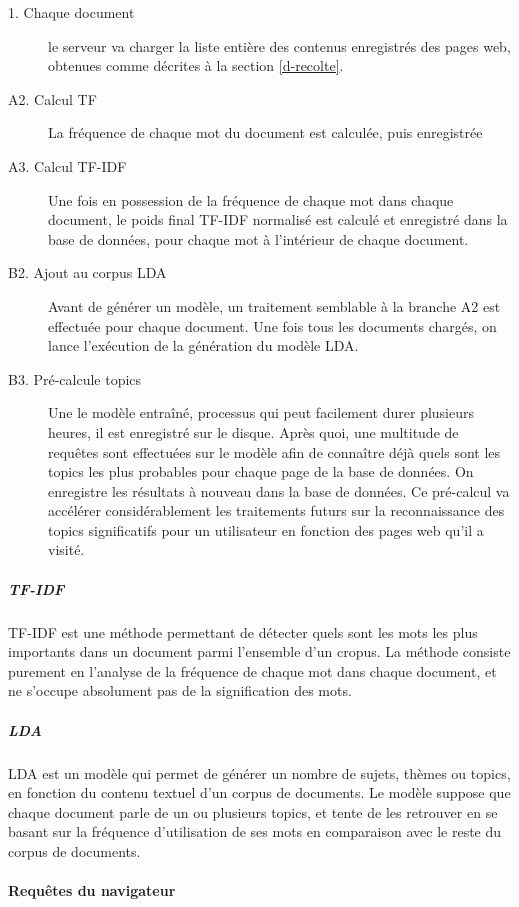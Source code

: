 				\begin{description}
					\item[1. Chaque document] le serveur va charger la liste entière des contenus enregistrés des pages web, obtenues comme décrites à la section \ref{d-recolte}.
					\item[A2. Calcul TF] La fréquence de chaque mot du document est calculée, puis enregistrée
					\item[A3. Calcul TF-IDF] Une fois en possession de la fréquence de chaque mot dans chaque document, le poids final TF-IDF normalisé est calculé et enregistré dans la base de données, pour chaque mot à l'intérieur de chaque document.
					\item[B2. Ajout au corpus LDA] Avant de générer un modèle, un traitement semblable à la branche A2 est effectuée pour chaque document. Une fois tous les documents chargés, on lance l'exécution de la génération du modèle LDA.
					\item[B3. Pré-calcule topics] Une le modèle entraîné, processus qui peut facilement durer plusieurs heures, il est enregistré sur le disque. Après quoi, une multitude de requêtes sont effectuées sur le modèle afin de connaître déjà quels sont les topics les plus probables pour chaque page de la base de données. On enregistre les résultats à nouveau dans la base de données. Ce pré-calcul va accélérer considérablement les traitements futurs sur la reconnaissance des topics significatifs pour un utilisateur en fonction des pages web qu'il a visité. 

				\end{description}

				\subparagraph{TF-IDF}

					TF-IDF est une méthode permettant de détecter quels sont les mots les plus importants dans un document parmi l'ensemble d'un cropus. La méthode consiste purement en l'analyse de la fréquence de chaque mot dans chaque document, et ne s'occupe absolument pas de la signification des mots.

				\subparagraph{LDA}

					LDA est un modèle qui permet de générer un nombre de sujets, thèmes ou topics, en fonction du contenu textuel d'un corpus de documents. Le modèle suppose que chaque document parle de un ou plusieurs topics, et tente de les retrouver en se basant sur la fréquence d'utilisation de ses mots en comparaison avec le reste du corpus de documents. 

			\paragraph{Requêtes du navigateur}


